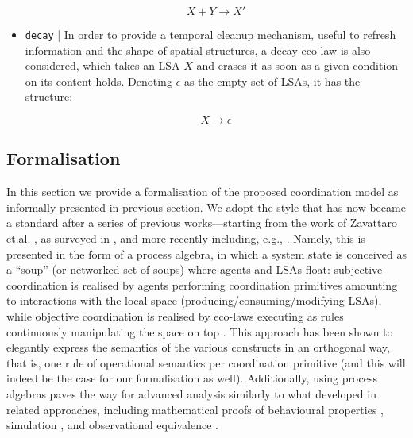 \documentclass[12pt,a4paper,twoside,openright]{book}
\begin{document}
\begin{itemize}
 \[X + Y \rightarrow X'\]
 
 \item \texttt{decay} | In order to provide a temporal cleanup mechanism, useful to refresh information and the shape of spatial structures, a decay eco-law is also considered, which takes an LSA $X$ and erases it as soon as a given condition on its content holds. Denoting $\epsilon$ as the empty set of LSAs, it has the structure:
 
 \[X \rightarrow \epsilon\]
 
\end{itemize}

\subsection{Formalisation}

In this section we provide a formalisation of the proposed coordination model as informally presented in previous section. We adopt the style that has now became a standard after a series of previous works---starting from the work of Zavattaro et.al. \cite{zavattaro}, as surveyed in \cite{VO-FI2006}, and more recently including, e.g., \cite{VPB-COORD2012,TerepetaNN12,BortolussiLM13,MassinkL12,LaneseBF13}.
%
Namely, this is presented in the form of a process algebra, in which a system state is conceived as a ``soup'' (or networked set of soups) where agents and LSAs float: subjective coordination is realised by agents performing coordination primitives amounting to interactions with the local space (producing/consuming/modifying LSAs), while objective coordination is realised by eco-laws executing as rules continuously manipulating the space on top \cite{biochemicalTupleSpaces,tucson-aamas99,RicciOD02}.
%
This approach has been shown to elegantly express the semantics of the various constructs in an orthogonal way, that is, one rule of operational semantics per coordination primitive (and this will indeed be the case for our formalisation as well). 
%
Additionally, using process algebras paves the way for advanced analysis similarly to what developed in related approaches, including mathematical proofs of behavioural properties \cite{V-SCW2013}, simulation \cite{sapereecolaws-sac2012,DeNicolaLM05}, and observational equivalence \cite{LaneseBF13}.
%
\end{document}
